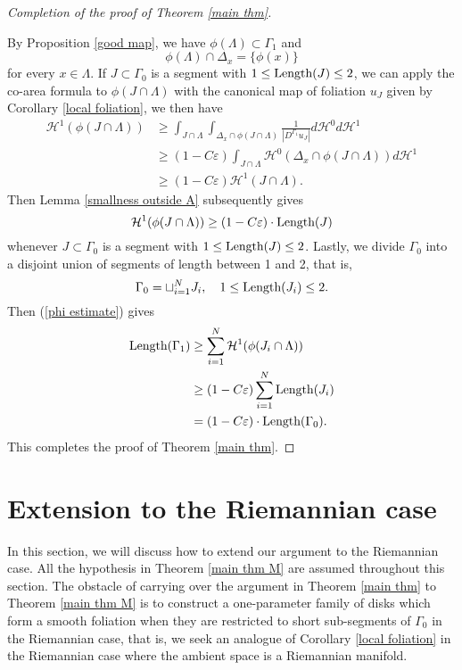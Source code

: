 \documentclass[a4paper, reqno]{amsart}
\theoremstyle{definition}
\theoremstyle{remark}
\numberwithin{equation}{section}
\newcommand{\Len}{\textup{Length}}
\numberwithin{equation}{section}
\numberwithin{equation}{section}
\begin{document}
\bigskip

\begin{proof}[Completion of the proof of Theorem \ref{main thm}]\

By Proposition \ref{good map}, we have $\phi(\Lambda)\subset\Gamma_1$ and
	\[\phi(\Lambda)\cap\Delta_x = \{\phi(x)\}\]
	for every $x\in \Lambda$. If $J\subset\Gamma_0$ is a segment with $1\leq\Len(J)\leq 2$, we can apply the co-area formula to $\phi(J\cap\Lambda)$ with the canonical map of foliation $u_{J}$ given by Corollary \ref{local foliation}, we then have
		\begin{align*}
			\mathcal{H}^1(\phi(J\cap\Lambda)) &\geq\int_{J\cap\Lambda}\int_{\Delta_x\cap\phi(J\cap\Lambda)}\frac{1}{|D^{\Gamma_1}u_{J}|}d\mathcal{H}^0 d\mathcal{H}^1\\
			&\geq (1-C\varepsilon)\int_{J\cap\Lambda}\mathcal{H}^0(\Delta_x\cap\phi(J\cap\Lambda))d\mathcal{H}^1\\
			&\geq (1-C\varepsilon)\mathcal{H}^1(J\cap\Lambda).
		\end{align*}
Then Lemma \ref{smallness outside A} subsequently gives
\begin{equation}{\label{phi estimate}}
	\mathcal{H}^1(\phi(J\cap\Lambda))\geq (1 - C\varepsilon)\cdot\Len(J)
\end{equation}
whenever $J\subset\Gamma_0$ is a segment with $1\leq\Len(J)\leq 2$.
Lastly, we divide $\Gamma_0$ into a disjoint union of segments of length between 1 and 2, that is,
\[ \Gamma_0 = \sqcup_{i = 1}^NJ_i,\quad 1\leq\Len(J_i)\leq 2.\]
Then (\ref{phi estimate}) gives
	\begin{align*}
		\Len(\Gamma_1) &\geq \sum_{i=1}^N\mathcal{H}^1(\phi(J_i\cap\Lambda))\\
		&\geq (1-C\varepsilon)\sum_{i=1}^N\Len(J_i)\\
		&= (1-C\varepsilon)\cdot\Len(\Gamma_0).
	\end{align*}
This completes the proof of Theorem \ref{main thm}.
\end{proof}


\bigskip

\appendix

\section{Extension to the Riemannian case}{\label{appendix a}}

In this section, we will discuss how to extend our argument to the Riemannian case. All the hypothesis in Theorem \ref{main thm M} are assumed throughout this section. The obstacle of carrying over the argument in Theorem \ref{main thm} to Theorem \ref{main thm M} is to construct a one-parameter family of disks which form a smooth foliation when they are restricted to short sub-segments of $\Gamma_0$ in the Riemannian case, that is, we seek an analogue of Corollary \ref{local foliation} in the Riemannian case where the ambient space is a Riemannian manifold.\\
\end{document}
